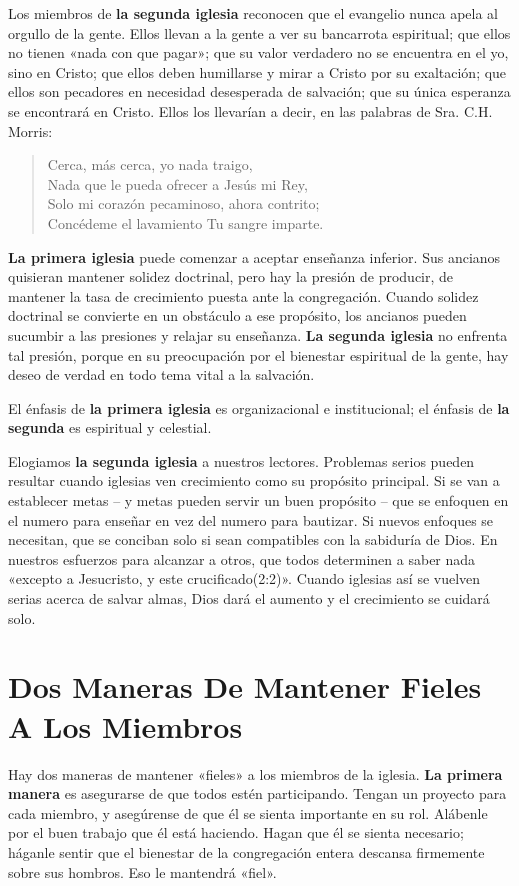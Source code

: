 \documentclass[12pt, twoside, openright]{book}
\begin{document}
Los miembros de \textbf{la segunda iglesia} reconocen que el evangelio nunca apela al orgullo de la gente. Ellos llevan a la gente a ver su bancarrota espiritual; que ellos no tienen «nada con que pagar»; que su valor verdadero no se encuentra en el yo, sino en Cristo; que ellos deben humillarse y mirar a Cristo por su exaltación; que ellos son pecadores en necesidad desesperada de salvación; que su única esperanza se encontrará en Cristo. Ellos los llevarían a decir, en las palabras de Sra. C.H. Morris: 
\begin{flushleft}
\begin{verse}
Cerca, más cerca, yo nada traigo,\\
Nada que le pueda ofrecer a Jesús mi Rey,\\
Solo mi corazón pecaminoso, ahora contrito;\\
Concédeme el lavamiento Tu sangre imparte.
\end{verse}
\end{flushleft}
\textbf{La primera iglesia} puede comenzar a aceptar enseñanza inferior. Sus ancianos quisieran mantener solidez doctrinal, pero hay la presión de producir, de mantener la tasa de crecimiento puesta ante la congregación. Cuando solidez doctrinal se convierte en un obstáculo a ese propósito, los ancianos pueden sucumbir a las presiones y relajar su enseñanza. \textbf{La segunda iglesia} no enfrenta tal presión, porque en su preocupación por el bienestar espiritual de la gente, hay deseo de verdad en todo tema vital a la salvación. 

El énfasis de \textbf{la primera iglesia} es organizacional e institucional; el énfasis de \textbf{la segunda} es espiritual y celestial. 

Elogiamos \textbf{la segunda iglesia} a nuestros lectores. Problemas serios pueden resultar cuando iglesias ven crecimiento como su propósito principal. Si se van a establecer metas – y metas pueden servir un buen propósito – que se enfoquen en el numero para enseñar en vez del numero para bautizar. Si nuevos enfoques se necesitan, que se conciban solo si sean compatibles con la sabiduría de Dios. En nuestros esfuerzos para alcanzar a otros, que todos determinen a saber nada «excepto a Jesucristo, y este crucificado(2:2)». Cuando iglesias así se vuelven serias acerca de salvar almas, Dios dará el aumento y el crecimiento se cuidará solo. 

\section{Dos Maneras De Mantener Fieles A Los Miembros}
Hay dos maneras de mantener «fieles» a los miembros de la iglesia. \textbf{La primera manera} es asegurarse de que todos estén participando. Tengan un proyecto para cada miembro, y asegúrense de que él se sienta importante en su rol. Alábenle por el buen trabajo que él está haciendo. Hagan que él se sienta necesario; háganle sentir que el bienestar de la congregación entera descansa firmemente sobre sus hombros. Eso le mantendrá «fiel». 
\end{document}
